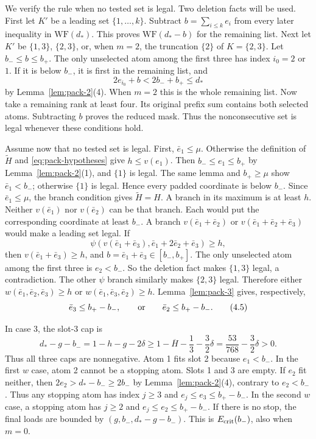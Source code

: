 We verify the rule when no tested set is legal. Two deletion facts
will be used. First let $K'$ be a leading set $\{1,\ldots,k\}$. Subtract
$b=\sum_{i\le k}e_i$ from every later inequality in
$\mathrm{WF}(d_*)$. This proves $\mathrm{WF}(d_*-b)$ for the remaining
list. Next let $K'$ be $\{1,3\}$, $\{2,3\}$, or, when $m=2$, the
truncation $\{2\}$ of $K=\{2,3\}$. Let $b_-\le b\le b_+$.
The only unselected atom among the first three has index $i_0=2$ or $1$.
If it is below $b_-$, it is first in the remaining list, and
\[
 2e_{i_0}+b<2b_-+b_+\le d_*
\]
by Lemma~\ref{lem:pack-2}(4). When $m=2$ this is the whole remaining list.
Now take a remaining rank at least four. Its original
prefix sum contains both selected atoms. Subtracting $b$ proves the
reduced mask. Thus the nonconsecutive set is legal whenever these
conditions hold.

Assume now that no tested set is legal. First, $\bar e_1\le\mu$. Otherwise the definition of $\widetilde H$ and
\eqref{eq:pack-hypotheses} give $h\le v(e_1)$. Then
$b_-\le e_1\le b_+$ by Lemma~\ref{lem:pack-2}(1), and $\{1\}$ is legal.
The same lemma and $b_+\ge\mu$ show $\bar e_1<b_-$; otherwise
$\{1\}$ is legal. Hence every padded coordinate is below $b_-$.
Since $\bar e_1\le\mu$, the branch condition gives
$\widetilde H=H$. A branch in its maximum is at least $h$.
Neither $v(\bar e_1)$ nor $v(\bar e_2)$ can be that branch.
Each would put the corresponding coordinate at least $b_-$. A branch
$v(\bar e_1+\bar e_2)$ or
$v(\bar e_1+\bar e_2+\bar e_3)$ would make a leading set legal.
If
\[
 \psi(v(\bar e_1+\bar e_3),\bar e_1+2\bar e_2+\bar e_3)\ge h,
\]
then $v(\bar e_1+\bar e_3)\ge h$, and
$b=\bar e_1+\bar e_3\in[b_-,b_+]$. The only unselected atom among
the first three is $e_2<b_-$. So the deletion fact makes $\{1,3\}$
legal, a contradiction. The other $\psi$ branch similarly makes
$\{2,3\}$ legal. Therefore either
$w(\bar e_1,\bar e_2,\bar e_3)\ge h$ or
$w(\bar e_1,\bar e_3,\bar e_2)\ge h$. Lemma~\ref{lem:pack-3} gives, respectively,
\[
 \bar e_3\le b_+-b_-,\qquad\hbox{or}\qquad
 \bar e_2\le b_+-b_-.
 \tag{4.5}\label{eq:pack-w-tail}
\]

In case 3, the slot-3 cap is
\[
d_*-g-b_-=1-h-g-2\delta\ge
1-\overline H-\frac13-\frac32\delta
=\frac{53}{768}-\frac32\delta>0.
\]
Thus all three caps are nonnegative. Atom 1 fits slot 2 because
$e_1<b_-$. In the first $w$ case, atom 2 cannot
be a stopping atom. Slots 1 and 3 are empty. If $e_2$ fit neither,
then $2e_2>d_*-b_-\ge2b_-$ by Lemma~\ref{lem:pack-2}(4), contrary to
$e_2<b_-$. Thus any stopping atom has index $j\ge3$ and
$e_j\le e_3\le b_+-b_-$. In the second $w$ case, a stopping atom
has $j\ge2$ and $e_j\le e_2\le b_+-b_-$. If there is no stop,
the final loads are bounded by $(g,b_-,d_*-g-b_-)$. This is
$E_{\rm crit}(b_-)$, also when $m=0$.

